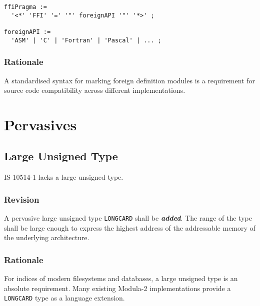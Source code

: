 \documentclass[10pt,a4paper,leqno,fleqn]{article}
\renewcommand{\emph}[1]{\textbf{\textit{#1}}}
\begin{document}
\begin{verbatim}
ffiPragma :=
  '<*' 'FFI' '=' '"' foreignAPI '"' '*>' ;
  
foreignAPI :=
  'ASM' | 'C' | 'Fortran' | 'Pascal' | ... ;
\end{verbatim}

\subsubsection{Rationale}

A standardised syntax for marking \glspl{foreign definition module}
is a requirement for source code compatibility across different
implementations.


\section{Pervasives}

\subsection{Large Unsigned Type}

IS 10514-1 lacks a large unsigned type.

\subsubsection{Revision}

A pervasive large unsigned type \texttt{LONGCARD} shall be \emph{added}.
The range of the type shall be large enough to express the highest
address of the addressable memory of the underlying architecture.

\subsubsection{Rationale}

For indices of modern filesystems and databases, a large unsigned type
is an absolute requirement. Many existing Modula-2 implementations
provide a \texttt{LONGCARD} type as a language extension.


\end{document}
